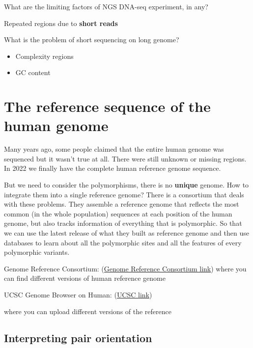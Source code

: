 What are the limiting factors of NGS DNA-seq experiment, in any?

Repeated regions due to \textbf{short reads}

What is the problem of short sequencing on long genome?

\begin{itemize}
  \item Complexity regions
  \item GC content
\end{itemize}


\hypertarget{the-reference-sequence-of-the-human-genome}{%
\section{The reference sequence of the human
genome}\label{the-reference-sequence-of-the-human-genome}}


Many years ago, some people claimed that the entire human genome was sequenced
but it wasn't true at all. There were still unknown or missing regions. In 2022
we finally have the complete human reference genome sequence.

But we need to consider the polymorphisms, there is no \textbf{unique} genome.
How to integrate them into a single reference genome? There is a consortium that
deals with these problems. They assemble a reference genome that reflects the
most common (in the whole population) sequences at each position of the human
genome, but also tracks information of everything that is polymorphic. So that
we can use the latest release of what they built as reference genome and then
use databases to learn about all the polymorphic sites and all the features of
every polymorphic variants.

Genome Reference Consortium:
(\href{https://www.ncbi.nlm.nih.gov/grc/human}{Genome Reference Consortium
link}) where you can find different versions of human reference genome

UCSC Genome Browser on Human: (\href{http://genome-euro.ucsc.edu/}{UCSC link})

where you can upload different versions of the reference


\hypertarget{interpreting-pair-orientation}{%
\subsection{Interpreting pair orientation}\label{interpreting-pair-orientation}}


